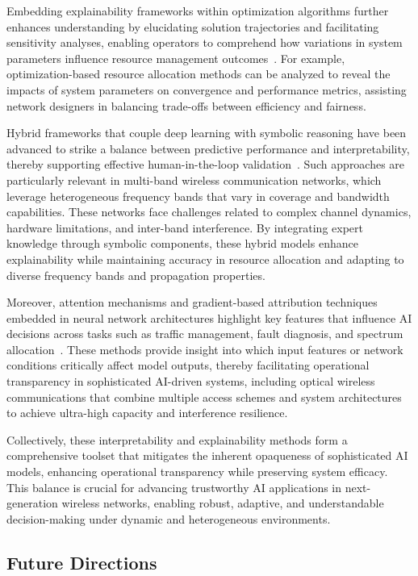 \documentclass[sigconf]{acmart}
\begin{document}
Embedding explainability frameworks within optimization algorithms further enhances understanding by elucidating solution trajectories and facilitating sensitivity analyses, enabling operators to comprehend how variations in system parameters influence resource management outcomes~\cite{ref8,ref9}. For example, optimization-based resource allocation methods can be analyzed to reveal the impacts of system parameters on convergence and performance metrics, assisting network designers in balancing trade-offs between efficiency and fairness.

Hybrid frameworks that couple deep learning with symbolic reasoning have been advanced to strike a balance between predictive performance and interpretability, thereby supporting effective human-in-the-loop validation~\cite{ref12}. Such approaches are particularly relevant in multi-band wireless communication networks, which leverage heterogeneous frequency bands that vary in coverage and bandwidth capabilities. These networks face challenges related to complex channel dynamics, hardware limitations, and inter-band interference. By integrating expert knowledge through symbolic components, these hybrid models enhance explainability while maintaining accuracy in resource allocation and adapting to diverse frequency bands and propagation properties.

Moreover, attention mechanisms and gradient-based attribution techniques embedded in neural network architectures highlight key features that influence AI decisions across tasks such as traffic management, fault diagnosis, and spectrum allocation~\cite{ref14}. These methods provide insight into which input features or network conditions critically affect model outputs, thereby facilitating operational transparency in sophisticated AI-driven systems, including optical wireless communications that combine multiple access schemes and system architectures to achieve ultra-high capacity and interference resilience.

Collectively, these interpretability and explainability methods form a comprehensive toolset that mitigates the inherent opaqueness of sophisticated AI models, enhancing operational transparency while preserving system efficacy. This balance is crucial for advancing trustworthy AI applications in next-generation wireless networks, enabling robust, adaptive, and understandable decision-making under dynamic and heterogeneous environments.

\subsection{Future Directions}
\end{document}
